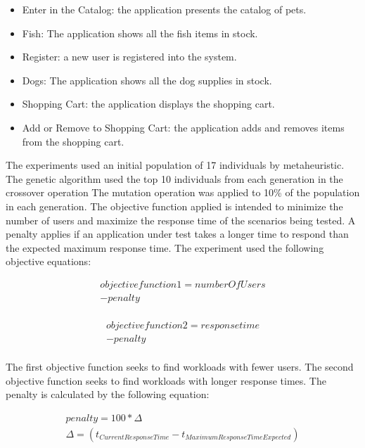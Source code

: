 \documentclass[espaco=umemeio,chapter=TITLE,twoside,openright]{abnt}
\begin{document}
\begin{itemize}
\item Enter in the Catalog: the application presents the catalog of pets.
\item Fish: The application shows all the fish items in stock.
\item Register:  a new user is registered into the system.
\item Dogs: The application shows all the dog supplies in stock.
\item Shopping Cart: the application displays the shopping cart.
\item Add or Remove to Shopping Cart: the application adds and removes items from the shopping cart.
\end{itemize}

The experiments used an initial population of 17 individuals by metaheuristic. The genetic algorithm used the top 10 individuals from each generation in the crossover operation  The mutation operation was applied to 10\% of the population in each generation. The objective function applied is intended to minimize the number of users and maximize the response time of the scenarios being tested. A penalty applies if an application under test takes a longer time to respond than the expected maximum response time. The experiment used the following objective equations:

\begin{equation}
\begin{aligned}
objective function 1 =numberOfUsers\\
-penalty\\
\end{aligned}
\end{equation}


\begin{equation}
\begin{aligned}
objective function 2 =responsetime\\
-penalty\\
\end{aligned}
\end{equation}

The first objective function seeks to find workloads with fewer users. The second objective function seeks to find workloads with longer response times. The penalty is calculated by the following equation:

\begin{equation}
\begin{aligned}
penalty=100 * \Delta \\
\Delta=(t_{Current Response Time} - t_{Maximum Response Time Expected})\\
\end{aligned}
\end{equation}
\end{document}
